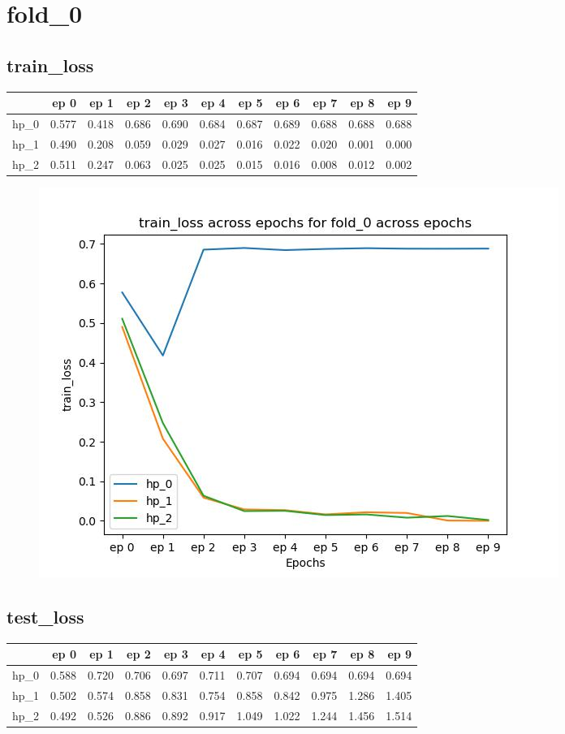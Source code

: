 \documentclass{article}
\begin{document}
\section{fold\_0}
\subsection{train\_loss}
\begin{tabular}{lrrrrrrrrrr}
\toprule
{} &   ep 0 &   ep 1 &   ep 2 &   ep 3 &   ep 4 &   ep 5 &   ep 6 &   ep 7 &   ep 8 &   ep 9 \\
\midrule
hp\_0 &  0.577 &  0.418 &  0.686 &  0.690 &  0.684 &  0.687 &  0.689 &  0.688 &  0.688 &  0.688 \\
hp\_1 &  0.490 &  0.208 &  0.059 &  0.029 &  0.027 &  0.016 &  0.022 &  0.020 &  0.001 &  0.000 \\
hp\_2 &  0.511 &  0.247 &  0.063 &  0.025 &  0.025 &  0.015 &  0.016 &  0.008 &  0.012 &  0.002 \\
\bottomrule
\end{tabular}

\begin{figure}[H]
\includegraphics[scale = 0.75]{fold_0/train_loss}
\end{figure}
\subsection{test\_loss}
\begin{tabular}{lrrrrrrrrrr}
\toprule
{} &   ep 0 &   ep 1 &   ep 2 &   ep 3 &   ep 4 &   ep 5 &   ep 6 &   ep 7 &   ep 8 &   ep 9 \\
\midrule
hp\_0 &  0.588 &  0.720 &  0.706 &  0.697 &  0.711 &  0.707 &  0.694 &  0.694 &  0.694 &  0.694 \\
hp\_1 &  0.502 &  0.574 &  0.858 &  0.831 &  0.754 &  0.858 &  0.842 &  0.975 &  1.286 &  1.405 \\
hp\_2 &  0.492 &  0.526 &  0.886 &  0.892 &  0.917 &  1.049 &  1.022 &  1.244 &  1.456 &  1.514 \\
\bottomrule
\end{tabular}
\end{document}
